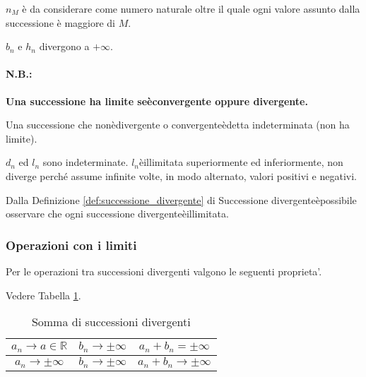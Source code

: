$n_M$ è da considerare come numero naturale oltre il quale ogni valore assunto dalla successione è maggiore di $M$.

\begin{example}
    $b_n$ e $h_n$ divergono a $+\infty$.
\end{example}

\paragraph{N.B.:}\textbf{Una successione ha limite seèconvergente oppure divergente.}

\begin{definition}
    Una successione che nonèdivergente o convergenteèdetta indeterminata (non ha limite).
\end{definition}

\begin{example}
    $d_n$ ed $l_n$ sono indeterminate. $l_n$èillimitata superiormente ed inferiormente, non diverge perché assume infinite volte, in modo alternato, valori positivi e negativi.
\end{example}

\begin{remark}\label{re:successione_divergente_illimitata}
    Dalla Definizione \ref{def:successione_divergente} di Successione divergenteèpossibile osservare che ogni successione divergenteèillimitata.
\end{remark}

\subsubsection{Operazioni con i limiti}
Per le operazioni tra successioni divergenti valgono le seguenti proprieta'.
\begin{property}
    Vedere Tabella \ref{tab:somma_successioni_divergenti}.
    \begin{table}[!hbt]
        \centering
        \begin{tabular}{|c|c|c|}
            \hline
            $a_n\rightarrow a\in\mathbb R$ & $b_n\rightarrow\pm\infty$ & $a_n+b_n = \pm\infty$\\
            \hline
            $a_n \rightarrow\pm\infty$ & $b_n\rightarrow\pm\infty$ & $a_n+b_n\rightarrow\pm\infty$\\
            \hline
        \end{tabular}
        \caption{Somma di successioni divergenti}
        \label{tab:somma_successioni_divergenti}
    \end{table}
\end{property}

